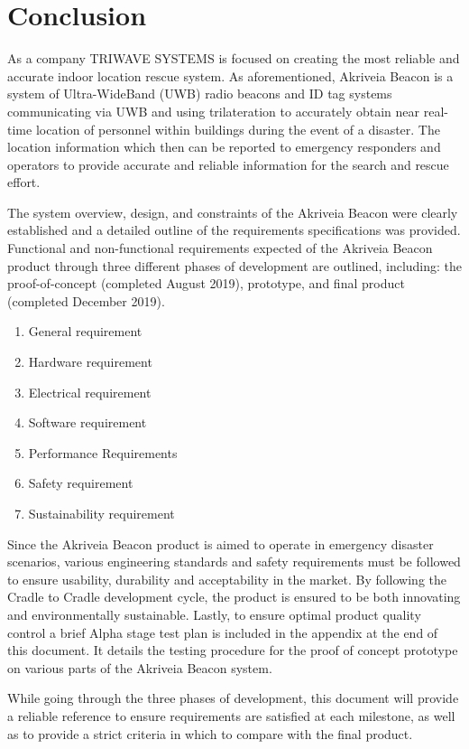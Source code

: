 

\setcounter{section}{5}
\section{Conclusion}
\bigskip
As a company TRIWAVE SYSTEMS is focused on creating the most reliable and accurate indoor location rescue system. As aforementioned, Akriveia Beacon is a system of Ultra-WideBand (UWB) radio beacons and ID tag systems communicating via UWB and using trilateration to accurately obtain near real-time location of personnel within buildings during the event of a disaster. The location information which then can be reported to emergency responders and operators to provide accurate and reliable information for the search and rescue effort. 

\bigskip
The system overview, design, and constraints of the Akriveia Beacon were clearly established and a detailed outline of the requirements specifications was provided. Functional and non-functional requirements expected of the Akriveia Beacon product through three different phases of development are outlined, including: the proof-of-concept (completed August 2019), prototype, and final product (completed December 2019).

\begin{enumerate}
\setlength\itemsep{0.25em}
	\item General requirement 
	\item Hardware requirement 
	\item Electrical requirement 
	\item Software requirement 
	\item Performance Requirements
	\item Safety requirement 
	\item Sustainability  requirement 
\end{enumerate}


Since the Akriveia Beacon product is aimed to operate in emergency disaster scenarios, various engineering standards and safety requirements must be followed to ensure usability, durability and acceptability in the market. By following the Cradle to Cradle development cycle, the product is ensured to be both innovating and environmentally sustainable. Lastly, to ensure optimal product quality control a brief Alpha stage test plan is included in the appendix at the end of this document. It details the testing procedure for the proof of concept prototype on various parts of the Akriveia Beacon system.

\bigskip
While going through the three phases of development, this document will provide a reliable
reference to ensure requirements are satisfied at each milestone, as well as to provide a strict criteria in which to compare with the final product.

%